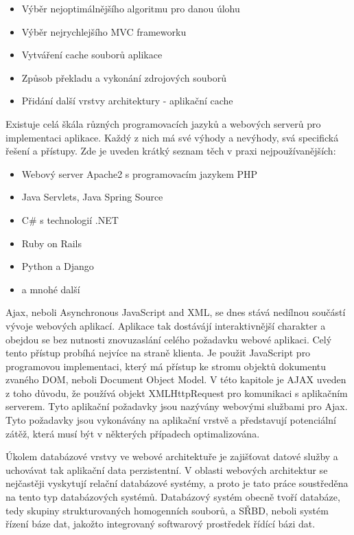 \documentclass[12pt]{article}
\begin{document}
\begin{itemize}
\item Výběr nejoptimálnějšího algoritmu pro danou úlohu
\item Výběr nejrychlejšího MVC frameworku
\item Vytváření cache souborů aplikace
\item Způsob překladu a vykonání zdrojových souborů
\item Přidání další vrstvy architektury - aplikační cache
\end{itemize}

Existuje celá škála různých programovacích jazyků a webových serverů pro implementaci aplikace. Každý z nich má své výhody a nevýhody, svá specifická řešení a přístupy. Zde je uveden krátký seznam těch v praxi nejpoužívanějších:

\begin{itemize}
\item Webový server Apache2 s programovacím jazykem PHP
\item Java Servlets, Java Spring Source
\item C\# s technologií .NET
\item Ruby on Rails
\item Python a Django
\item a mnohé další
\end{itemize}

Ajax, neboli Asynchronous JavaScript and XML, se dnes stává nedílnou součástí vývoje webových aplikací. Aplikace tak dostávájí interaktivnější charakter a obejdou se bez nutnosti znovuzaslání celého požadavku webové aplikaci. Celý tento přístup probíhá nejvíce na straně klienta. Je použit JavaScript pro programovou implementaci, který má přístup ke stromu objektů dokumentu zvaného DOM, neboli Document Object Model. V této kapitole je AJAX uveden z toho důvodu, že používá objekt XMLHttpRequest pro komunikaci s aplikačním serverem. Tyto aplikační požadavky jsou nazývány webovými službami pro Ajax. Tyto požadavky jsou vykonávány na aplikační vrstvě a představují potenciální zátěž, která musí být v některých případech optimalizována.\cite{ajax}



\label{sec:database}
Úkolem databázové vrstvy ve webové architektuře je zajišťovat datové služby a uchovávat tak aplikační data perzistentní. V oblasti webových architektur se nejčastěji vyskytují relační databázové systémy, a proto je tato práce soustředěna na tento typ databázových systémů. Databázový systém obecně tvoří databáze, tedy skupiny strukturovaných homogenních souborů, a SŘBD, neboli systém řízení báze dat, jakožto integrovaný softwarový prostředek řídící bázi dat.
\end{document}
